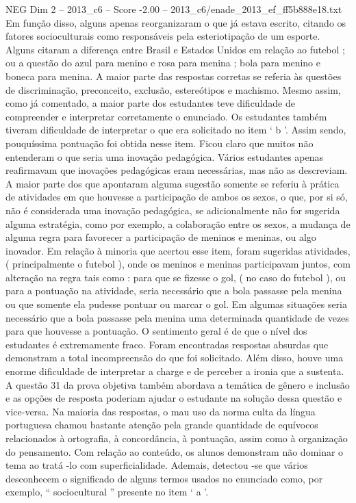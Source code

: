 \begin{textsample}{NEG Dim 2 – 2013\_c6 – Score -2.00 – 2013\_c6/enade\_2013\_ef\_ff5b888e18.txt}
Em função disso, alguns apenas reorganizaram o que já estava escrito, citando os fatores socioculturais como responsáveis pela esteriotipação de um esporte.
Alguns citaram a diferença entre Brasil e Estados Unidos em relação ao futebol ; ou a questão do azul para menino e rosa para menina ; bola para menino e boneca para menina.
A maior parte das respostas corretas se referia às questões de discriminação, preconceito, exclusão, estereótipos e machismo.
Mesmo assim, como já comentado, a maior parte dos estudantes teve dificuldade de compreender e interpretar corretamente o enunciado.
Os estudantes também tiveram dificuldade de interpretar o que era solicitado no item ‘ b ’.
Assim sendo, pouquíssima pontuação foi obtida nesse item.
Ficou claro que muitos não entenderam o que seria uma inovação pedagógica.
Vários estudantes apenas reafirmavam que inovações pedagógicas eram necessárias, mas não as descreviam.
A maior parte dos que apontaram alguma sugestão somente se referiu à prática de atividades em que houvesse a participação de ambos os sexos, o que, por si só, não é considerada uma inovação pedagógica, se adicionalmente não for sugerida alguma estratégia, como por exemplo, a colaboração entre os sexos, a mudança de alguma regra para favorecer a participação de meninos e meninas, ou algo inovador.
Em relação à minoria que acertou esse item, foram sugeridas atividades, ( principalmente o futebol ), onde os meninos e meninas participavam juntos, com alteração na regra tais como : para que se fizesse o gol, ( no caso do futebol ), ou para a pontuação na atividade, seria necessário que a bola passasse pela menina ou que somente ela pudesse pontuar ou marcar o gol.
Em algumas situações seria necessário que a bola passasse pela menina uma determinada quantidade de vezes para que houvesse a pontuação.
O sentimento geral é de que o nível dos estudantes é extremamente fraco.
Foram encontradas respostas absurdas que demonstram a total incompreensão do que foi solicitado.
Além disso, houve uma enorme dificuldade de interpretar a charge e de perceber a ironia que a sustenta.
A questão 31 da prova objetiva também abordava a temática de gênero e inclusão e as opções de resposta poderiam ajudar o estudante na solução dessa questão e vice-versa.
Na maioria das respostas, o mau uso da norma culta da língua portuguesa chamou bastante atenção pela grande quantidade de equívocos relacionados à ortografia, à concordância, à pontuação, assim como à organização do pensamento.
Com relação ao conteúdo, os alunos demonstram não dominar o tema ao tratá -lo com superficialidade.
Ademais, detectou -se que vários desconhecem o significado de alguns termos usados no enunciado como, por exemplo, “ sociocultural ” presente no item ‘ a ’.

\end{textsample}

